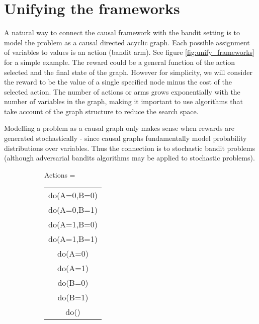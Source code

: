 \documentclass[11pt,a4paper]{article}
\begin{document}
\section{Unifying the frameworks}
\label{sec:unificaition}

A natural way to connect the causal framework with the bandit setting is to model the problem as a causal directed acyclic graph. Each possible assignment of variables to values is an action (bandit arm). See figure \ref{fig:unify_frameworks} for a simple example. The reward could be a general function of the action selected and the final state of the graph. However for simplicity, we will consider the reward to be the value of a single specified node minus the cost of the selected action. The number of actions or arms grows exponentially with the number of variables in the graph, making it important to use algorithms that take account of the graph structure to reduce the search space. 

Modelling a problem as a causal graph only makes sense when rewards are generated stochastically - since causal graphs fundamentally model probability distributions over variables. Thus the connection is to stochastic bandit problems (although adversarial bandits algorithms may be applied to stochastic problems). 


\begin{figure}[h]
\caption{A simple causal graphical model and corresponding complete action space. A and B represent binary variables that can be intervened on and Y represents the reward.}
\label{fig:unify_frameworks}
\centering
\begin{subfigure}[c]{0.3\textwidth}
\end{subfigure}
\begin{subfigure}[t]{0.4\textwidth}
Actions = \begin{tabular}{|c|}
	\hline
  do(A=0,B=0) \\
  do(A=0,B=1) \\
  do(A=1,B=0) \\
  do(A=1,B=1) \\
  \hline
  do(A=0) \\
  do(A=1) \\
  do(B=0) \\
  do(B=1) \\
  do() \\
  \hline
\end{tabular}
\end{subfigure}
\end{figure}
\end{document}
